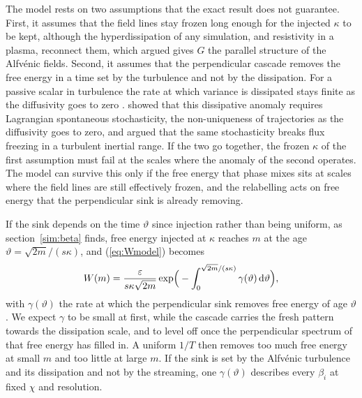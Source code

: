 The model rests on two assumptions that the exact result does not guarantee. First, it assumes that the field lines stay frozen long enough for the injected $\kappa$ to be kept, although the hyperdissipation of any simulation, and resistivity in a plasma, reconnect them, which \citet{Meyrand2019} argued gives $G$ the parallel structure of the Alfv\'enic fields. Second, it assumes that the perpendicular cascade removes the free energy in a time set by the turbulence and not by the dissipation. For a passive scalar in turbulence the rate at which variance is dissipated stays finite as the diffusivity goes to zero \citep{ShraimanSiggia2000,FalkovichGawedzkiVergassola2001}. \citet{DrivasEyink2017} showed that this dissipative anomaly requires Lagrangian spontaneous stochasticity, the non-uniqueness of trajectories as the diffusivity goes to zero, and \citet[\S VIII.C]{Eyink2018} argued that the same stochasticity breaks flux freezing in a turbulent inertial range. If the two go together, the frozen $\kappa$ of the first assumption must fail at the scales where the anomaly of the second operates. The model can survive this only if the free energy that phase mixes sits at scales where the field lines are still effectively frozen, and the relabelling acts on free energy that the perpendicular sink is already removing.

If the sink depends on the time $\vartheta$ since injection rather than being uniform, as section~\ref{sim:beta} finds, free energy injected at $\kappa$ reaches $m$ at the age $\vartheta=\sqrt{2m}/(s\kappa)$, and (\ref{eq:Wmodel}) becomes
\begin{equation}\label{eq:Wage}
  W(m)=\frac{\varepsilon}{s\kappa\sqrt{2m}}\exp\!\Big(-\int_0^{\sqrt{2m}/(s\kappa)}\gamma(\vartheta)\,\mathrm{d}\vartheta\Big),
\end{equation}
with $\gamma(\vartheta)$ the rate at which the perpendicular sink removes free energy of age $\vartheta$. We expect $\gamma$ to be small at first, while the cascade carries the fresh pattern towards the dissipation scale, and to level off once the perpendicular spectrum of that free energy has filled in. A uniform $1/T$ then removes too much free energy at small $m$ and too little at large $m$. If the sink is set by the Alfv\'enic turbulence and its dissipation and not by the streaming, one $\gamma(\vartheta)$ describes every $\beta_i$ at fixed $\chi$ and resolution.
